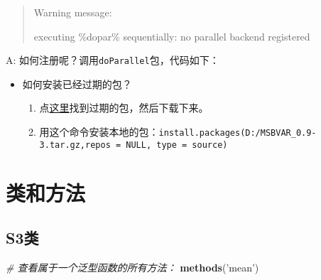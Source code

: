 \documentclass[
]{book}
\newenvironment{Shaded}{\begin{snugshade}}{\end{snugshade}}
\newcommand{\CommentTok}[1]{\textcolor[rgb]{0.56,0.35,0.01}{\textit{#1}}}
\newcommand{\DataTypeTok}[1]{\textcolor[rgb]{0.13,0.29,0.53}{#1}}
\newcommand{\DecValTok}[1]{\textcolor[rgb]{0.00,0.00,0.81}{#1}}
\newcommand{\KeywordTok}[1]{\textcolor[rgb]{0.13,0.29,0.53}{\textbf{#1}}}
\newcommand{\NormalTok}[1]{#1}
\newcommand{\OperatorTok}[1]{\textcolor[rgb]{0.81,0.36,0.00}{\textbf{#1}}}
\newcommand{\StringTok}[1]{\textcolor[rgb]{0.31,0.60,0.02}{#1}}
\providecommand{\tightlist}{%
  \setlength{\itemsep}{0pt}\setlength{\parskip}{0pt}}
\begin{document}
\begin{quote}
Warning message:

executing \%dopar\% sequentially: no parallel backend registered
\end{quote}

A: 如何注册呢？调用\texttt{doParallel}包，代码如下：

\begin{Shaded}
\end{Shaded}

\begin{itemize}
\tightlist
\item
  如何安装已经过期的包？

  \begin{enumerate}
  \def\labelenumi{\arabic{enumi}.}
  \tightlist
  \item
    点\href{https://cran.r-project.org/src/contrib/Archive/}{这里}找到过期的包，然后下载下来。
  \item
    用这个命令安装本地的包：\texttt{install.packages(\textquotesingle{}D:/MSBVAR\_0.9-3.tar.gz\textquotesingle{},repos\ =\ NULL,\ type\ =\ \textquotesingle{}source\textquotesingle{})}
  \end{enumerate}
\end{itemize}

\hypertarget{ux7c7bux548cux65b9ux6cd5}{%
\section{类和方法}\label{ux7c7bux548cux65b9ux6cd5}}

\hypertarget{s3ux7c7b}{%
\subsection{S3类}\label{s3ux7c7b}}

\begin{Shaded}
\begin{Highlighting}[]
\CommentTok{# 查看属于一个泛型函数的所有方法：}
\KeywordTok{methods}\NormalTok{(}\StringTok{'mean'}\NormalTok{)}
\end{Highlighting}
\end{Shaded}
\end{document}
